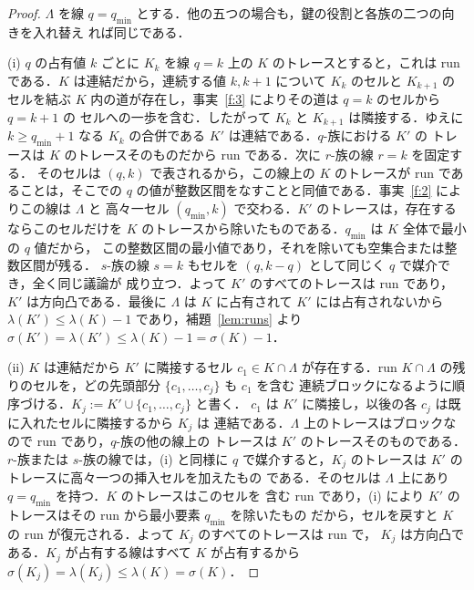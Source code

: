 \documentclass[11pt]{article}
\theoremstyle{plain}
\theoremstyle{definition}
\theoremstyle{remark}
\begin{document}
\begin{proof}
\(\Lambda\) を線 \(q=q_{\min}\) とする．他の五つの場合も，鍵の役割と各族の二つの向きを入れ替え
れば同じである．

(i) \(q\) の占有値 \(k\) ごとに \(K_{k}\) を線 \(q=k\) 上の \(K\) のトレースとすると，これは
run である．\(K\) は連結だから，連続する値 \(k,k+1\) について \(K_{k}\) のセルと \(K_{k+1}\) の
セルを結ぶ \(K\) 内の道が存在し，事実~\ref{f:3} によりその道は \(q=k\) のセルから \(q=k+1\) の
セルへの一歩を含む．したがって \(K_{k}\) と \(K_{k+1}\) は隣接する．ゆえに
\(k\ge q_{\min}+1\) なる \(K_{k}\) の合併である \(K'\) は連結である．\(q\)-族における \(K'\) の
トレースは \(K\) のトレースそのものだから run である．次に \(r\)-族の線 \(r=k\) を固定する．
そのセルは \((q,k)\) で表されるから，この線上の \(K\) のトレースが run であることは，そこでの
\(q\) の値が整数区間をなすことと同値である．事実~\ref{f:2} によりこの線は \(\Lambda\) と
高々一セル \((q_{\min},k)\) で交わる．\(K'\) のトレースは，存在するならこのセルだけを
\(K\) のトレースから除いたものである．\(q_{\min}\) は \(K\) 全体で最小の \(q\) 値だから，
この整数区間の最小値であり，それを除いても空集合または整数区間が残る．
\(s\)-族の線 \(s=k\) もセルを \((q,k-q)\) として同じく \(q\) で媒介でき，全く同じ議論が
成り立つ．よって \(K'\) のすべてのトレースは run であり，\(K'\) は方向凸である．最後に
\(\Lambda\) は \(K\) に占有されて \(K'\) には占有されないから \(\lambda(K')\le\lambda(K)-1\) であり，補題~\ref{lem:runs} より
\(\sigma(K')=\lambda(K')\le\lambda(K)-1=\sigma(K)-1\)．

(ii) \(K\) は連結だから \(K'\) に隣接するセル \(c_{1}\in K\cap\Lambda\) が存在する．run
\(K\cap\Lambda\) の残りのセルを，どの先頭部分 \(\{c_{1},\dots,c_{j}\}\) も \(c_{1}\) を含む
連続ブロックになるように順序づける．\(K_{j}:=K'\cup\{c_{1},\dots,c_{j}\}\) と書く．
\(c_{1}\) は \(K'\) に隣接し，以後の各 \(c_{j}\) は既に入れたセルに隣接するから \(K_{j}\) は
連結である．\(\Lambda\) 上のトレースはブロックなので run であり，\(q\)-族の他の線上の
トレースは \(K'\) のトレースそのものである．\(r\)-族または \(s\)-族の線では，(i) と同様に
\(q\) で媒介すると，\(K_j\) のトレースは \(K'\) のトレースに高々一つの挿入セルを加えたもの
である．そのセルは \(\Lambda\) 上にあり \(q=q_{\min}\) を持つ．\(K\) のトレースはこのセルを
含む run であり，(i) により \(K'\) のトレースはその run から最小要素 \(q_{\min}\) を除いたもの
だから，セルを戻すと \(K\) の run が復元される．よって \(K_j\) のすべてのトレースは run で，
\(K_j\) は方向凸である．\(K_j\) が占有する線はすべて \(K\) が占有するから
\(\sigma(K_{j})=\lambda(K_{j})\le\lambda(K)=\sigma(K)\)．
\end{proof}
\end{document}
